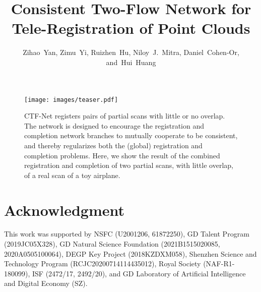 \documentclass[10pt,journal,compsoc]{IEEEtran}
\begin{document}
\title{Consistent Two-Flow Network for Tele-Registration of Point Clouds}

\author{
	Zihao~Yan, Zimu~Yi, Ruizhen~Hu, Niloy~J.~Mitra, Daniel~Cohen-Or, and~Hui~Huang
}




\maketitle
\IEEEdisplaynontitleabstractindextext
\IEEEpeerreviewmaketitle

\begin{figure*}
	\centering
	\texttt{[image: images/teaser.pdf]}
	\caption{CTF-Net registers pairs of partial scans with little or no overlap. 
			The network is designed to encourage the registration and completion network branches to mutually cooperate to be consistent, and thereby regularizes both the (global)  registration and completion problems. Here, we show the result of the combined registration and completion of two partial scans, with little overlap, of a real scan of a toy airplane.}
	\label{fig:teaser}
\end{figure*}









\section*{Acknowledgment}
This work was supported by NSFC (U2001206, 61872250), GD Talent Program (2019JC05X328), GD Natural Science Foundation (2021B1515020085, 2020A0505100064), DEGP Key Project (2018KZDXM058), Shenzhen Science and Technology Program (RCJC20200714114435012), Royal Society (NAF-R1-180099), ISF (2472/17, 2492/20), and GD Laboratory of Artificial Intelligence and Digital Economy (SZ).
\end{document}
